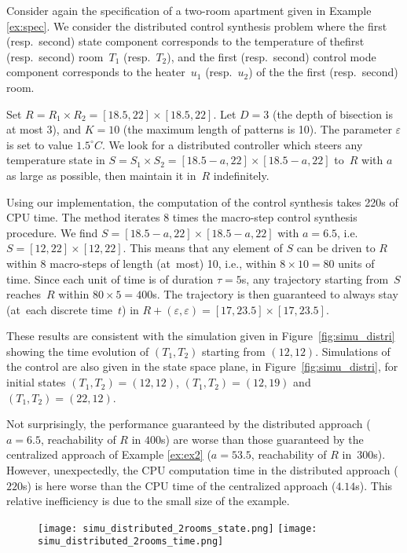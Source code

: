 \begin{example}
Consider again the specification of a two-room apartment given in
Example \ref{ex:spec}.  We consider the distributed control synthesis
problem where the first (resp.~second) state component corresponds to
the temperature of thefirst (resp.~second) room~$T_1$ (resp.~$T_2$),
and the first (resp.~second) control mode component corresponds to the
heater~$u_1$ (resp.~$u_2$) of the the first (resp.~second) room.

Set $R=R_1\times R_2=[18.5,22]\times[18.5,22]$.
Let $D=3$ (the depth of bisection is at most 3),
and $K=10$ (the maximum length of patterns is 10).
The parameter $\varepsilon$ is set to value $1.5^\circ C$.
We look for a distributed controller 
which steers any temperature state
in $S=S_1\times S_2=[18.5-a,22]\times [18.5-a,22]$
to~$R$ with $a$ as large as possible, 
then maintain it in~$R$ indefinitely.

Using our implementation, the computation of the control synthesis
takes 220s of CPU time.
%
The method iterates 8 times the macro-step control synthesis
procedure.  We find $S=[18.5-a,22]\times [18.5-a,22]$ with $a=6.5$,
i.e.  $S=[12,22]\times[12,22]$.  This means that any element of $S$
can be driven to $R$ within 8 macro-steps of length (at~most) 10,
i.e., within $8\times 10=80$ units of time.  Since each unit of time
is of duration $\tau=5$s, any trajectory starting from~$S$ reaches~$R$
within $80\times 5=400$s.  The trajectory is then guaranteed to always
stay (at~each discrete time~$t$) in
$R+(\varepsilon,\varepsilon)=[17,23.5]\times[17,23.5]$.

These results are consistent with the simulation given in
Figure~\ref{fig:simu_distri} showing the time evolution of $(T_1,T_2)$
starting from $(12,12)$.  Simulations of the control are also given in
the state space plane, in Figure~\ref{fig:simu_distri}, for initial
states $(T_1,T_2)=(12,12)$, $(T_1,T_2)=(12,19)$ and
$(T_1,T_2)=(22,12)$.

Not surprisingly, the performance guaranteed by the distributed
approach ($a = 6.5$, reachability of $R$ in $400$s) are worse than
those guaranteed by the centralized approach of Example \ref{ex:ex2}
($a=53.5$, reachability of $R$ in~$300$s).  However, unexpectedly, the
CPU computation time in the distributed approach ($220$s) is here
worse than the CPU time of the centralized approach ($4.14$s). This
relative inefficiency is due to the small size of the example.

\begin{figure}[t]
  \centering
   \texttt{[image: simu\_distributed\_2rooms\_state.png]}
\qquad
   \texttt{[image: simu\_distributed\_2rooms\_time.png]}


\end{figure}
\end{example}
